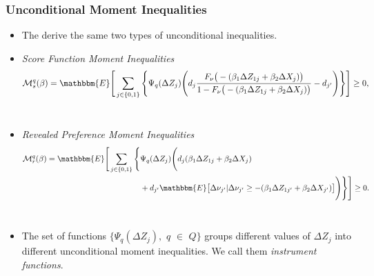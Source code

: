 
\begin{frame}
\frametitle{Unconditional Moment Inequalities}

\begin{itemize}
\item The derive the same two types of unconditional inequalities. 

\item \textit{Score Function Moment Inequalities}  {\small \ 
\begin{align*}
\mathcal{M}^{q}_{s}(\beta)=\mathbbm{E}\Bigg[\sum_{j\in\{0,1\}}\Bigg\{%
\Psi_{q}(\Delta Z_{j})\Bigg(d_{j}\frac{F_{\nu}\big(-(\beta_{1}\Delta
Z_{1j}+\beta_{2}\Delta X_{j})\big)}{1-F_{\nu}\big(-(\beta_{1}\Delta
Z_{1j}+\beta_{2}\Delta X_{j})\big)}-d_{j^{\prime }}\Bigg)\Bigg\}\Bigg]\geq 0,
\end{align*}
}{\normalsize \ }

\item {\normalsize \textit{Revealed Preference Moment Inequalities}  }%
{\small \ 
\begin{align*}
\mathcal{M}^{q}_{r}(\beta)=\mathbbm{E}\Bigg[\sum_{j\in\{0,1\}}\Bigg\{%
&\Psi_{q}(\Delta Z_{j})\Bigg(d_{j}(\beta_{1}\Delta Z_{1j}+\beta_{2}\Delta
X_{j})  \notag \\
&+d_{j^{\prime }}\mathbbm{E}\big[\Delta\nu_{j^{\prime
}}|\Delta\nu_{j^{\prime }}\geq-(\beta_{1}\Delta Z_{1j^{\prime
}}+\beta_{2}\Delta X_{j^{\prime }})\big]\Bigg)\Bigg\}\Bigg]\geq 0.
\end{align*}
}{\normalsize \ }

\item {\normalsize The set of functions $\{\Psi_{q}(\Delta Z_{j}),$ $q$ $\in$
$Q\}$ groups different values of $\Delta Z_{j}$ into different unconditional
moment inequalities. We call them \textit{instrument functions}. }
\end{itemize}
\end{frame}


